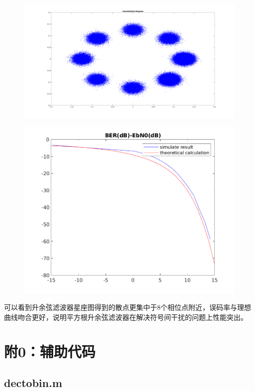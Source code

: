 \begin{spacing}{1.5}
\begin{figure}[H]
\centering
\includegraphics[width = \columnwidth]{constellation-src.png}
\end{figure}

\begin{figure}[H]
\centering
\includegraphics[width = \columnwidth]{BER-src.png}
\end{figure}

可以看到升余弦滤波器星座图得到的散点更集中于8个相位点附近，误码率与理想曲线吻合更好，说明平方根升余弦滤波器在解决符号间干扰的问题上性能突出。

\section{附0：辅助代码}

\subsection{dectobin.m}


\end{spacing}
